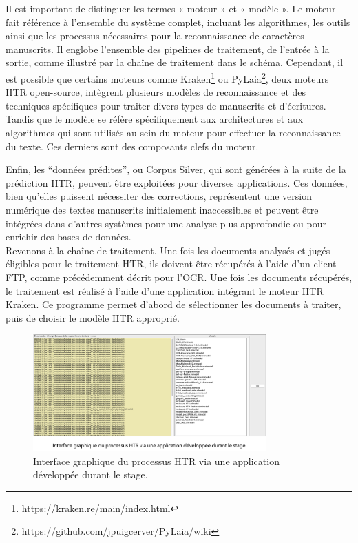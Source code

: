 \documentclass[a4paper,12pt,twoside]{book}
\begin{document}
	Il est important de distinguer les termes « moteur » et « modèle ». Le moteur fait référence à l’ensemble du système complet, incluant les algorithmes, les outils ainsi que les processus nécessaires pour la reconnaissance de caractères manuscrits. Il englobe l’ensemble des pipelines de traitement, de l’entrée à la sortie, comme illustré par la chaîne de traitement dans le schéma. Cependant, il est possible que certains moteurs comme Kraken\footnote{ https://kraken.re/main/index.html} ou PyLaia\footnote{https://github.com/jpuigcerver/PyLaia/wiki}, deux moteurs HTR open-source, intègrent plusieurs modèles de reconnaissance et des techniques spécifiques pour traiter divers types de manuscrits et d’écritures. Tandis que le modèle se réfère spécifiquement aux architectures et aux algorithmes qui sont utilisés au sein du moteur pour effectuer la reconnaissance du texte. Ces derniers sont des composants clefs du moteur.

	Enfin, les “données prédites”, ou Corpus Silver, qui sont générées à la suite de la prédiction HTR, peuvent être exploitées pour diverses applications. Ces données, bien qu’elles puissent nécessiter des corrections, représentent une version numérique des textes manuscrits initialement inaccessibles et peuvent être intégrées dans d’autres systèmes pour une analyse plus approfondie ou pour enrichir des bases de données.
	\\
	
	Revenons à la chaîne de traitement. Une fois les documents analysés et jugés éligibles pour le traitement HTR, ils doivent être récupérés à l'aide d'un client FTP, comme précédemment décrit pour l'OCR. Une fois les documents récupérés, le traitement est réalisé à l'aide d'une application intégrant le moteur HTR Kraken. Ce programme permet d'abord de sélectionner les documents à traiter, puis de choisir le modèle HTR approprié. 
	\\
	
	\begin{figure}[h!]
		\centering
		\includegraphics[width=0.8\textwidth]{images/app_htr_proc.png}
		\caption{Interface graphique du processus HTR via une application développée durant le stage.}
		\label{fig:monimage}
	\end{figure}
	
\end{document}
